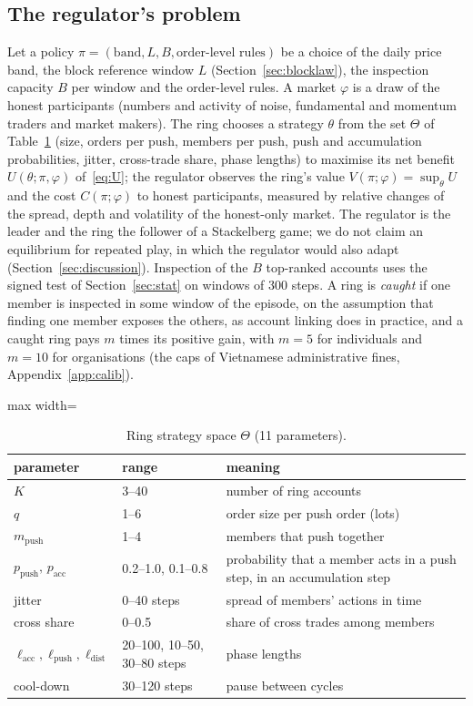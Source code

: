 \subsection{The regulator's problem}\label{sec:problem}

Let a policy $\pi=(\text{band},L,B,\text{order-level rules})$ be a choice of the daily price band, the block reference window $L$ (Section~\ref{sec:blocklaw}), the inspection capacity $B$ per window and the order-level rules. A market $\varphi$ is a draw of the honest participants (numbers and activity of noise, fundamental and momentum traders and market makers). The ring chooses a strategy $\theta$ from the set $\Theta$ of Table~\ref{tab:space} (size, orders per push, members per push, push and accumulation probabilities, jitter, cross-trade share, phase lengths) to maximise its net benefit $U(\theta;\pi,\varphi)$ of~\eqref{eq:U}; the regulator observes the ring's value $V(\pi;\varphi)=\sup_\theta U$ and the cost $C(\pi;\varphi)$ to honest participants, measured by relative changes of the spread, depth and volatility of the honest-only market. The regulator is the leader and the ring the follower of a Stackelberg game; we do not claim an equilibrium for repeated play, in which the regulator would also adapt (Section~\ref{sec:discussion}). Inspection of the $B$ top-ranked accounts uses the signed test of Section~\ref{sec:stat} on windows of 300 steps. A ring is \emph{caught} if one member is inspected in some window of the episode, on the assumption that finding one member exposes the others, as account linking does in practice, and a caught ring pays $m$ times its positive gain, with $m=5$ for individuals and $m=10$ for organisations (the caps of Vietnamese administrative fines, Appendix~\ref{app:calib}).

\begin{table}[t]
\centering\footnotesize
\begin{adjustbox}{max width=\linewidth}
\begin{tabular}{lll}
\toprule
parameter & range & meaning\\
\midrule
$K$ & 3--40 & number of ring accounts\\
$q$ & 1--6 & order size per push order (lots)\\
$m_{\mathrm{push}}$ & 1--4 & members that push together\\
$p_{\mathrm{push}},\,p_{\mathrm{acc}}$ & 0.2--1.0, 0.1--0.8 & probability that a member acts in a push step, in an accumulation step\\
jitter & 0--40 steps & spread of members' actions in time\\
cross share & 0--0.5 & share of cross trades among members\\
$\ell_{\mathrm{acc}},\ell_{\mathrm{push}},\ell_{\mathrm{dist}}$ & 20--100, 10--50, 30--80 steps & phase lengths\\
cool-down & 30--120 steps & pause between cycles\\
\bottomrule
\end{tabular}
\end{adjustbox}
\caption{Ring strategy space $\Theta$ (11 parameters).}\label{tab:space}
\end{table}

